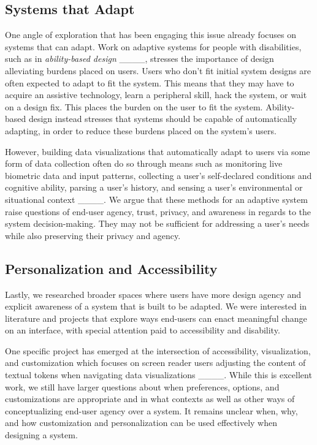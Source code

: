 \subsection{Systems that Adapt}

One angle of exploration that has been engaging this issue already focuses on systems that can adapt. Work on adaptive systems for people with disabilities, such as in \textit{ability-based design} ____, stresses the importance of design alleviating burdens placed on users. Users who don't fit initial system designs are often expected to adapt to fit the system. This means that they may have to acquire an assistive technology, learn a peripheral skill, hack the system, or wait on a design fix. This places the burden on the user to fit the system. Ability-based design instead stresses that systems should be capable of automatically adapting, in order to reduce these burdens placed on the system's users. 

However, building data visualizations that automatically adapt to users via some form of data collection often do so through means such as monitoring live biometric data and input patterns, collecting a user's self-declared conditions and cognitive ability, parsing a user's history, and sensing a user's environmental or situational context ____. We argue that these methods for an adaptive system raise questions of end-user agency, trust, privacy, and awareness in regards to the system decision-making. They may not be sufficient for addressing a user's needs while also preserving their privacy and agency.


\subsection{Personalization and Accessibility}
Lastly, we researched broader spaces where users have more design agency and explicit awareness of a system that is built to be adapted. We were interested in literature and projects that explore ways end-users can enact meaningful change on an interface, with special attention paid to accessibility and disability.

One specific project has emerged at the intersection of accessibility, visualization, and customization which focuses on screen reader users adjusting the content of textual tokens when navigating data visualizations ____. While this is excellent work, we still have larger questions about when preferences, options, and customizations are appropriate and in what contexts as well as other ways of conceptualizing end-user agency over a system. It remains unclear when, why, and how customization and personalization can be used effectively when designing a system.

